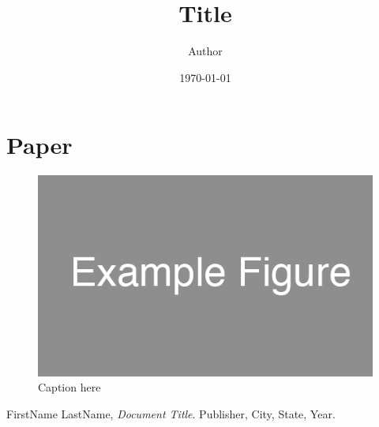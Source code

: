 \documentclass[12pt]{article}
\title{Title}
\author{
        Author \\
}
\date{\today}
\begin{document}
\maketitle

\begin{abstract}
\end{abstract}

\section{Paper} \label{sec:paper}

\begin{figure}[]
  \centering
  \includegraphics[width=.5\textwidth]{example_figure.png}
  \caption{Caption here}
  \label{fig:1}
\end{figure}

\begin{thebibliography}{9}

FirstName LastName,
  \emph{Document Title}.
  Publisher,
  City, State,
  Year.

\end{thebibliography}
\end{document}
